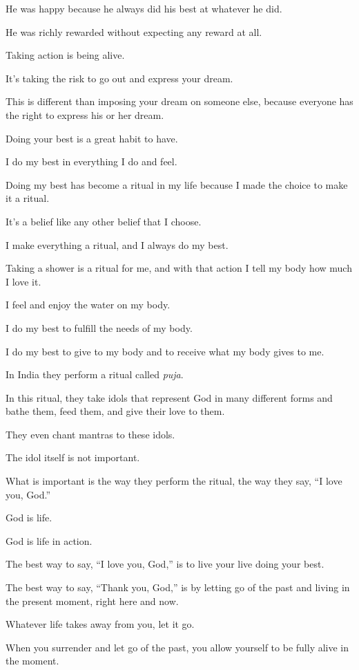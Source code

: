\documentclass{article}
\numberwithin{equation}{section}
\begin{document}
He was happy because he always did his best at whatever he did.

He was richly rewarded without expecting any reward at all.

Taking action is being alive.

It's taking the risk to go out and express your dream.

This is different than imposing your dream on someone else, because everyone has the right to express his or her dream.

%
Doing your best is a great habit to have.

I do my best in everything I do and feel.

Doing my best has become a ritual in my life because I made the choice to make it a ritual.

It's a belief like any other belief that I choose.

I make everything a ritual, and I always do my best.

Taking a shower is a ritual for me, and with that action I tell my body how much I love it.

I feel and enjoy the water on my body.

I do my best to fulfill the needs of my body.

I do my best to give to my body and to receive what my body gives to me.

%
In India they perform a ritual called \textit{puja}.

In this ritual, they take idols that represent God in many different forms and bathe them, feed them, and give their love to them.

They even chant mantras to these idols.

The idol itself is not important.

What is important is the way they perform the ritual, the way they say, ``I love you, God.''

%
God is life.

God is life in action.

The best way to say, ``I love you, God,'' is to live your live doing your best.

The best way to say, ``Thank you, God,'' is by letting go of the past and living in the present moment, right here and now.

Whatever life takes away from you, let it go.

When you surrender and let go of the past, you allow yourself to be fully alive in the moment.
\end{document}
